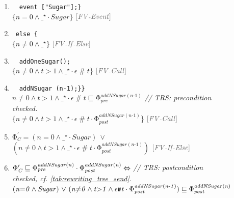 \documentclass[acmsmall,10pt,review]{acmart}
\newcommand{\siderule}[1]{
\code{\footnotesize{\textcolor{mGray}{#1}}}}
\newcommand{\effect}{{\ensuremath{\mathrm{\Phi}}}}
\newcommand{\anyevent}[1]{{\textcolor{darkred}
{{\textbf{\footnotesize #1}}}}}
\newcommand{\code}[1]{{\tt{\ensuremath{\m{#1}}}}}
\newcommand{\CONTAIN}{\sqsubseteq}
\newcommand{\m}{\mathit}
\newcommand{\mysharp}{{\mathrel{\texttt{\#}}}}
\begin{document}
{\begin{figure}[!ht]
\begin{minipage}[c]{\columnwidth}
{\begin{enumerate}
      \item ~\qquad~\qquad \lstinline|event ["Sugar"];} |  \\
     \textcolor{darklavender}{\code{\{n{=}0 \wedge   \_^\star \cdot Sugar\} }} 
     \quad \siderule{\scriptsize [FV\text{-}Event]}
     \item 
     ~\qquad \lstinline|else {| \\
     \textcolor{darklavender}{\code{\{ n  {\neq} 0 \wedge   \_^\star \}  }} 
     \quad \siderule{\scriptsize [FV\text{-}If\text{-}Else]}
    \item 
     ~\qquad~\qquad \lstinline|addOneSugar();| \\
     \textcolor{darklavender}{\code{\{n  {\neq} 0 \wedge  t{>}1  \wedge \_^\star \cdot \epsilon \mysharp t  }\}} 
     \quad \siderule {\scriptsize [FV\text{-}Call]}
     \item 
     ~\qquad~\qquad \lstinline|addNSugar (n-1);}}|  \\
     \textcolor{huntergreen}{\code{n  {\neq} 0   \wedge t{>}1  \wedge \_^\star \cdot \epsilon \mysharp t   \CONTAIN \effect_{pre}^{addNSugar(n\text{-}1)} }}
      \quad \textcolor{mGray}{\footnotesize  \emph{// TRS: precondition checked.}}
\\
     \textcolor{darklavender}{\code{\{n  {\neq} 0  \wedge t{>}1  \wedge \_^\star 
     \cdot \epsilon \mysharp t \cdot \effect_{post}^{addNSugar(n\text{-}1)} }\}} 
     \quad \siderule {\scriptsize [FV\text{-}Call]}
      \item \textcolor{darklavender}{\code{\effect_C^\prime {=} (n{=}0 \wedge  \_^\star \cdot Sugar)\ \vee\ }
      \code{ (n  {\neq} 0  \wedge t{>}1  \wedge \_^\star \cdot \epsilon \mysharp t \cdot \effect_{post}^{addNSugar(n\text{-}1)} ) }} 
      \quad \siderule{\scriptsize [FV\text{-}If\text{-}Else]}
      \\
       \item 
       \textcolor{darkred}{\code{
       \effect_C^\prime \CONTAIN \effect_{pre}^{addNSugar(n)} \cdot \effect_{post}^{addNSugar(n)} \Leftrightarrow  }}  
       \quad \textcolor{mGray}{\footnotesize  \emph{// TRS: postcondition checked, cf. \autoref{tab:rewriting_tree_send}. }}
        \\ 
        \textcolor{darkred}{\code{\code{\code{(n{=}0 \wedge Sugar)\ \vee\ }
        \code{ (n  {\neq} 0  \wedge  t{>}1  \wedge \epsilon \mysharp t \cdot \effect_{post}^{addNSugar(n\text{-}1)}) } \CONTAIN \effect_{post}^{addNSugar(n)}}}}\\
    

\end{enumerate}}
\end{minipage}
\end{figure}}
\end{document}
